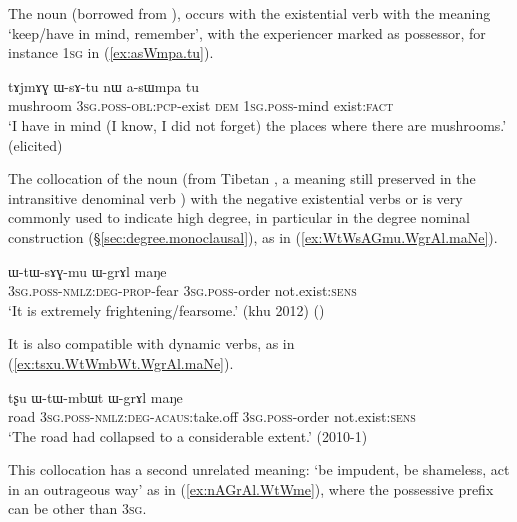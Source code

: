 The noun  (borrowed from ),  occurs with the existential verb  with the meaning `keep/have in mind, remember', with the experiencer marked as possessor, for instance \textsc{1sg} in (\ref{ex:asWmpa.tu}).

\begin{exe}
\ex \label{ex:asWmpa.tu}
\gll  tɤjmɤɣ ɯ-sɤ-tu nɯ a-sɯmpa tu \\
mushroom \textsc{3sg}.\textsc{poss}-\textsc{obl}:\textsc{pcp}-exist \textsc{dem} \textsc{1sg}.\textsc{poss}-mind exist:\textsc{fact} \\
\glt `I have in mind (I know, I did not forget) the places where there are mushrooms.' (elicited)
\end{exe}

The collocation of the noun  (from Tibetan , a meaning still preserved in the intransitive denominal verb ) with the negative existential verbs  or  is very commonly used to indicate high degree,  in particular in the degree nominal construction (§\ref{sec:degree.monoclausal}), as in (\ref{ex:WtWsAGmu.WgrAl.maNe}).

\begin{exe}
\ex \label{ex:WtWsAGmu.WgrAl.maNe}
\gll  ɯ-tɯ-sɤɣ-mu ɯ-grɤl maŋe \\
\textsc{3sg}.\textsc{poss}-\textsc{nmlz}:\textsc{deg}-\textsc{prop}-fear \textsc{3sg}.\textsc{poss}-order not.exist:\textsc{sens} \\
\glt `It is extremely frightening/fearsome.' (khu 2012)
()
\end{exe}

It is also compatible with dynamic verbs, as in (\ref{ex:tsxu.WtWmbWt.WgrAl.maNe}).

\begin{exe}
\ex \label{ex:tsxu.WtWmbWt.WgrAl.maNe}
\gll  tʂu ɯ-tɯ-mbɯt ɯ-grɤl maŋe \\
road \textsc{3sg}.\textsc{poss}-\textsc{nmlz}:\textsc{deg}-\textsc{acaus}:take.off  \textsc{3sg}.\textsc{poss}-order not.exist:\textsc{sens}  \\
\glt `The road had collapsed to a considerable extent.' (2010-1)
\end{exe}


This collocation has a second unrelated meaning: `be impudent, be shameless, act in an outrageous way' as in (\ref{ex:nAGrAl.WtWme}), where the possessive prefix can be other than \textsc{3sg}.

